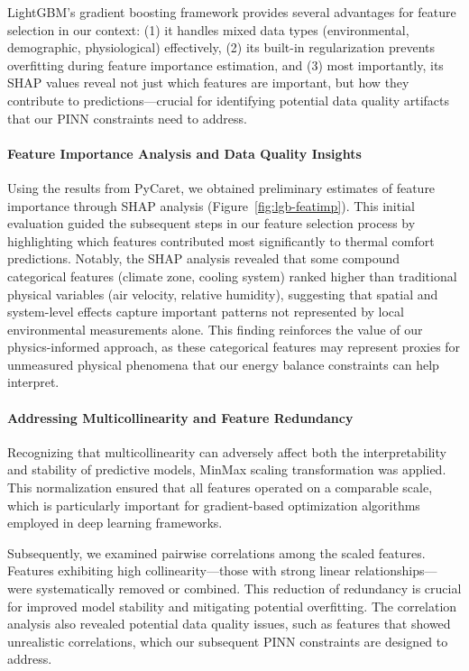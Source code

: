 LightGBM's gradient boosting framework provides several advantages for feature selection in our context: (1) it handles mixed data types (environmental, demographic, physiological) effectively, (2) its built-in regularization prevents overfitting during feature importance estimation, and (3) most importantly, its SHAP values reveal not just which features are important, but how they contribute to predictions—crucial for identifying potential data quality artifacts that our PINN constraints need to address.

\paragraph{Feature Importance Analysis and Data Quality Insights} Using the results from PyCaret, we obtained preliminary estimates of feature importance through SHAP analysis (Figure~\ref{fig:lgb-featimp}). This initial evaluation guided the subsequent steps in our feature selection process by highlighting which features contributed most significantly to thermal comfort predictions. Notably, the SHAP analysis revealed that some compound categorical features (climate zone, cooling system) ranked higher than traditional physical variables (air velocity, relative humidity), suggesting that spatial and system-level effects capture important patterns not represented by local environmental measurements alone. This finding reinforces the value of our physics-informed approach, as these categorical features may represent proxies for unmeasured physical phenomena that our energy balance constraints can help interpret.

\paragraph{Addressing Multicollinearity and Feature Redundancy} Recognizing that multicollinearity can adversely affect both the interpretability and stability of predictive models, MinMax scaling transformation was applied. This normalization ensured that all features operated on a comparable scale, which is particularly important for gradient-based optimization algorithms employed in deep learning frameworks.

Subsequently, we examined pairwise correlations among the scaled features. Features exhibiting high collinearity—those with strong linear relationships—were systematically removed or combined. This reduction of redundancy is crucial for improved model stability and mitigating potential overfitting. The correlation analysis also revealed potential data quality issues, such as features that showed unrealistic correlations, which our subsequent PINN constraints are designed to address.

